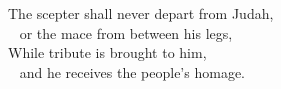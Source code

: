 
\lettrine{T}{}he scepter shall never depart from Judah, \\
  or the mace from between his legs, \\
While tribute is brought to him, \\
  and he receives the people’s homage.